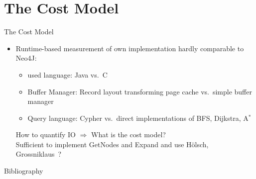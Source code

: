 \documentclass[rgb]{beamer}
\begin{document}
\section{The Cost Model}
    \begin{frame}{The Cost Model}
        \begin{itemize}
            \item Runtime-based measurement of own implementation hardly comparable to Neo4J\@: \vspace{0.3cm} \\
                \begin{itemize}
                    \item used language: Java vs.\ C
                    \item Buffer Manager: Record layout transforming page cache vs.\ simple buffer manager
                    \item Query language: Cypher vs.\ direct implementations of BFS, Dijkstra, A$^*$ \vspace{0.8cm} \\
                \end{itemize}
                \alert{How to quantify IO $\Rightarrow$ What is the cost model?} \vspace{0.4cm}\\
                Sufficient to implement GetNodes and Expand and use Hölsch, Grossniklaus~\autocite{holsch}?
        \end{itemize}
    \end{frame}

    \begin{frame}{Bibliography}
        \printbibliography%
    \end{frame}
\end{document}
